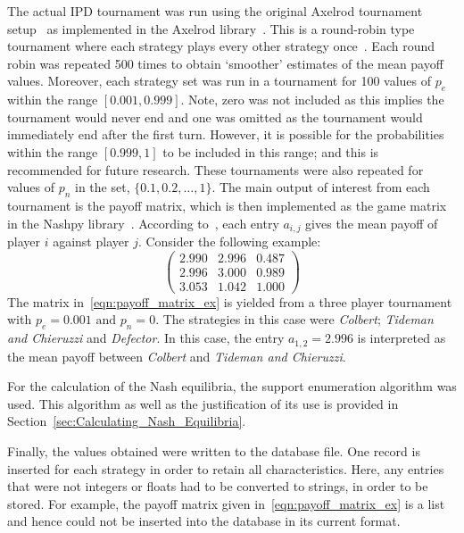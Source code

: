 The actual IPD tournament was run using the original Axelrod tournament
setup~\cite{adeoye2012application} as implemented in the
Axelrod library~\cite{axelrodproject}. This is a round-robin type tournament where each
strategy plays every other strategy once~\cite{axelrod1980effective}.
Each round robin was repeated 500 times to obtain `smoother' estimates of
the mean payoff values. Moreover, each strategy set was run in a tournament for
100 values of \(p_{e}\) within the range \([0.001, 0.999]\). Note, zero was
not included as this implies the tournament would never end and one was
omitted as the tournament would immediately end after the first turn. However,
it is possible for the probabilities within the range \([0.999, 1]\) to be
included in this range; and this is recommended for
future research. These tournaments were also repeated for values of \(p_{n}\) in the set, \( \{0.1, 0.2, \ldots, 1\} \). The main output of interest
from each tournament is the payoff matrix, which is then implemented as the game
matrix in the Nashpy library~\cite{Nashpy2019}.
According to~\cite{axelrodproject}, each entry \(a_{i,j}\) gives the mean payoff
of player \(i\) against player \(j\). Consider the following example:
\begin{equation}
    \begin{pmatrix}
        2.990 &   2.996  &   0.487\\  
        2.996 &   3.000  &   0.989\\
        3.053 &   1.042  &   1.000        
    \end{pmatrix}
\end{equation}\label{eqn:payoff_matrix_ex}
The matrix in~\eqref{eqn:payoff_matrix_ex} is yielded from a three player
tournament with \(p_{e}=0.001 \text{ and } p_{n}=0\). The strategies in this case were \textit{Colbert}; \textit{Tideman and Chieruzzi} and
\textit{Defector}. In this case, the entry \(a_{1,2} = 2.996\) is interpreted as the
mean payoff between \textit{Colbert} and \textit{Tideman and Chieruzzi}. 

For the calculation of the Nash equilibria, the support enumeration
algorithm was used. This algorithm as well as the justification of its use is
provided in Section~\ref{sec:Calculating_Nash_Equilibria}.

Finally, the values obtained were written to the database file. One record is
inserted for each strategy in order to retain all characteristics. Here, any
entries that were not integers or floats had to be converted to strings, in order
to be stored. For example, the payoff matrix given
in~\eqref{eqn:payoff_matrix_ex} is a list and hence could not be inserted into the
database in its current format.


